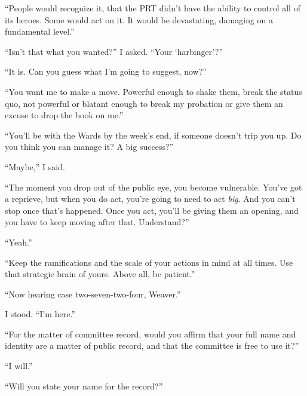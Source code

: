 ``People would recognize it, that the PRT didn't have the ability to control all of its heroes.  Some would act on it.  It would be devastating, damaging on a fundamental level.''



``Isn't that what you wanted?'' I asked.  ``Your `harbinger'?''



``It is.  Can you guess what I'm going to suggest, now?''



``You want me to make a move.  Powerful enough to shake them, break the status quo, not powerful or blatant enough to break my probation or give them an excuse to drop the book on me.''



``You'll be with the Wards by the week's end, if someone doesn't trip you up.  Do you think you can manage it?  A big success?''



``Maybe,'' I said.



``The moment you drop out of the public eye, you become vulnerable.  You've got a reprieve, but when you do act, you're going to need to act \emph{big}.  And you can't stop once that's happened.  Once you act, you'll be giving them an opening, and you have to keep moving after that.  Understand?''



``Yeah.''



``Keep the ramifications and the scale of your actions in mind at all times.  Use that strategic brain of yours.  Above all, be patient.''



\sectionbreak



``Now hearing case two-seven-two-four, Weaver.''



I stood.  ``I'm here.''



``For the matter of committee record, would you affirm that your full name and identity are a matter of public record, and that the committee is free to use it?''



``I will.''



``Will you state your name for the record?''



